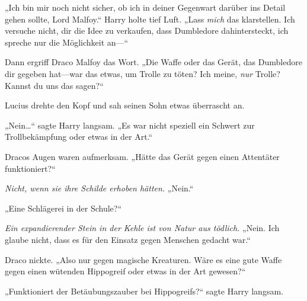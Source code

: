 „Ich bin mir noch nicht sicher, ob ich in deiner Gegenwart darüber ins Detail gehen sollte, Lord Malfoy.“
Harry holte tief Luft.
„Lass \emph{mich} das klarstellen. Ich versuche nicht, dir die Idee zu verkaufen, dass Dumbledore dahintersteckt, ich spreche nur die Möglichkeit an—“

Dann ergriff Draco Malfoy das Wort.
„Die Waffe oder das Gerät, das Dumbledore dir gegeben hat—war das etwas, um Trolle zu töten? Ich meine, \emph{nur} Trolle? Kannst du uns das sagen?“

Lucius drehte den Kopf und sah seinen Sohn etwas überrascht an.

„Nein…“ sagte Harry langsam. „Es war nicht speziell ein Schwert zur Trollbekämpfung oder etwas in der Art.“

Dracos Augen waren aufmerksam.
„Hätte das Gerät gegen einen Attentäter funktioniert?“

\emph{Nicht, wenn sie ihre Schilde erhoben hätten.}
„Nein.“

„Eine Schlägerei in der Schule?“

\emph{Ein expandierender Stein in der Kehle ist von Natur aus tödlich.}
„Nein. Ich glaube nicht, dass es für den Einsatz gegen Menschen gedacht war.“

Draco nickte.
„Also nur gegen magische Kreaturen. Wäre es eine gute Waffe gegen einen wütenden Hippogreif oder etwas in der Art gewesen?“

„Funktioniert der Betäubungszauber bei Hippogreifs?“ sagte Harry langsam.

